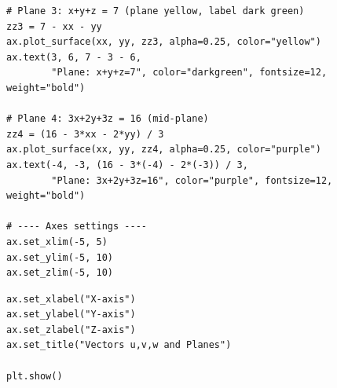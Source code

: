 \documentclass{beamer}
\theoremstyle{remark}
\numberwithin{equation}{section}
\begin{document}
\begin{frame}[fragile]
\begin{lstlisting}
# Plane 3: x+y+z = 7 (plane yellow, label dark green)
zz3 = 7 - xx - yy
ax.plot_surface(xx, yy, zz3, alpha=0.25, color="yellow")
ax.text(3, 6, 7 - 3 - 6,
        "Plane: x+y+z=7", color="darkgreen", fontsize=12, weight="bold")

# Plane 4: 3x+2y+3z = 16 (mid-plane)
zz4 = (16 - 3*xx - 2*yy) / 3
ax.plot_surface(xx, yy, zz4, alpha=0.25, color="purple")
ax.text(-4, -3, (16 - 3*(-4) - 2*(-3)) / 3,
        "Plane: 3x+2y+3z=16", color="purple", fontsize=12, weight="bold")

# ---- Axes settings ----
ax.set_xlim(-5, 5)
ax.set_ylim(-5, 10)
ax.set_zlim(-5, 10)
\end{lstlisting}
\end{frame}
\begin{frame}[fragile]
\begin{lstlisting}
ax.set_xlabel("X-axis")
ax.set_ylabel("Y-axis")
ax.set_zlabel("Z-axis")
ax.set_title("Vectors u,v,w and Planes")

plt.show()

\end{lstlisting}
\end{frame}
\end{document}
